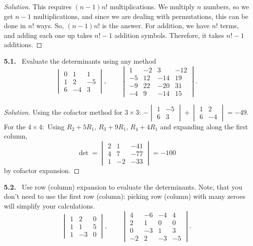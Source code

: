 \documentclass[12pt]{amsart}
\theoremstyle{plain}
\theoremstyle{definition}
\theoremstyle{remark}
\newenvironment{problem}[1]{\par\medskip\noindent\textbf{#1.}\ }{\par\smallskip}
\newenvironment{solution}{\begin{proof}[Solution]}{\end{proof}}
\begin{document}
\begin{solution}
  This requires $(n-1)n!$ multiplications. We multiply $n$ numbers, so we get $n-1$ multiplications, and since we are dealing with permutations, this can be done in $n!$ ways. So, $(n-1)n!$ is the answer. For addition, we have $n!$ terms, and adding each one up takes $n!-1$ addition symbols. Therefore, it takes $n! - 1$ additions.
\end{solution}

\begin{problem}{5.1}
Evaluate the determinants using any method
\[
  \begin{vmatrix} 0 & 1 & 1 \\ 1 & 2 & -5 \\ 6 & -4 & 3 \end{vmatrix}, \qquad
  \begin{vmatrix}
    1 & -2 & 3 & -12 \\
    -5 & 12 & -14 & 19 \\
    -9 & 22 & -20 & 31 \\
    -4 & 9 & -14 & 15
  \end{vmatrix}.
\]
\end{problem}

\begin{solution}
    Using the cofactor method for $3 \times 3$: $-\begin{vmatrix}
        1 & -5 \\ 6 & 3
    \end{vmatrix} + \begin{vmatrix}
        1 & 2 \\ 6 & -4
    \end{vmatrix} = -49$.
\\
    For the $4 \times 4:$ Using $R_2 + 5R_1$, $R_3 + 9R_1$, $R_4 + 4R_1$ and expanding along the first column,
\[
  \det = \begin{vmatrix} 2 & 1 & -41 \\ 4 & 7 & -77 \\ 1 & -2 & -33 \end{vmatrix}=-100
\]
by cofactor expansion.
\end{solution}
\begin{problem}{5.2}
Use row (column) expansion to evaluate the determinants. Note, that you don't need to use the first row (column): picking row (column) with many zeroes will simplify your calculations.
\[
  \begin{vmatrix} 1 & 2 & 0 \\ 1 & 1 & 5 \\ 1 & -3 & 0 \end{vmatrix}, \qquad
  \begin{vmatrix}
    4 & -6 & -4 & 4 \\
    2 & 1 & 0 & 0 \\
    0 & -3 & 1 & 3 \\
    -2 & 2 & -3 & -5
  \end{vmatrix}.
\]
\end{problem}
\end{document}
